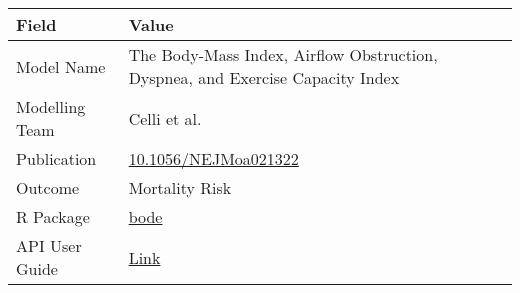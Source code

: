 \documentclass[
]{book}
\begin{document}
\begin{longtable}[]{@{}ll@{}}
\toprule
\begin{minipage}[b]{0.45\columnwidth}\raggedright
Field\strut
\end{minipage} & \begin{minipage}[b]{0.49\columnwidth}\raggedright
Value\strut
\end{minipage}\tabularnewline
\midrule
\endhead
\begin{minipage}[t]{0.45\columnwidth}\raggedright
Model Name\strut
\end{minipage} & \begin{minipage}[t]{0.49\columnwidth}\raggedright
The Body-Mass Index, Airflow Obstruction, Dyspnea, and Exercise Capacity Index\strut
\end{minipage}\tabularnewline
\begin{minipage}[t]{0.45\columnwidth}\raggedright
Modelling Team\strut
\end{minipage} & \begin{minipage}[t]{0.49\columnwidth}\raggedright
Celli et al.\strut
\end{minipage}\tabularnewline
\begin{minipage}[t]{0.45\columnwidth}\raggedright
Publication\strut
\end{minipage} & \begin{minipage}[t]{0.49\columnwidth}\raggedright
\href{https://doi.org/10.1056/NEJMoa021322}{10.1056/NEJMoa021322}\strut
\end{minipage}\tabularnewline
\begin{minipage}[t]{0.45\columnwidth}\raggedright
Outcome\strut
\end{minipage} & \begin{minipage}[t]{0.49\columnwidth}\raggedright
Mortality Risk\strut
\end{minipage}\tabularnewline
\begin{minipage}[t]{0.45\columnwidth}\raggedright
R Package\strut
\end{minipage} & \begin{minipage}[t]{0.49\columnwidth}\raggedright
\href{https://github.com/resplab/bode}{bode}\strut
\end{minipage}\tabularnewline
\begin{minipage}[t]{0.45\columnwidth}\raggedright
API User Guide\strut
\end{minipage} & \begin{minipage}[t]{0.49\columnwidth}\raggedright
\href{https://resplab.github.io/prismguide/api-users-guide.html\#bode-1}{Link}\strut
\end{minipage}\tabularnewline
\bottomrule
\end{longtable}
\end{document}
